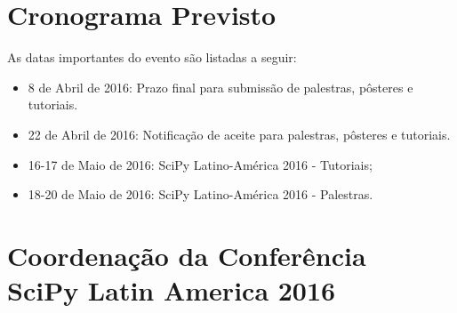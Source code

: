 \documentclass[a4paper,twocolumn,openright,article,12pt]{memoir}
\begin{document}

\chapter*{Cronograma Previsto}

As datas importantes do evento são listadas a seguir:
\begin{itemize}
\item 8 de Abril de 2016: Prazo final para submissão de palestras, pôsteres e
tutoriais.
\item 22 de Abril de 2016: Notificação de aceite para palestras, pôsteres e
tutoriais.
\item 16-17 de Maio de 2016: SciPy Latino-América 2016 - Tutoriais;
\item 18-20 de Maio de 2016: SciPy Latino-América 2016 - Palestras.
\end{itemize}

\onecolumn
\chapter*{Coordenação da Conferência \\SciPy Latin America 2016}
\end{document}

